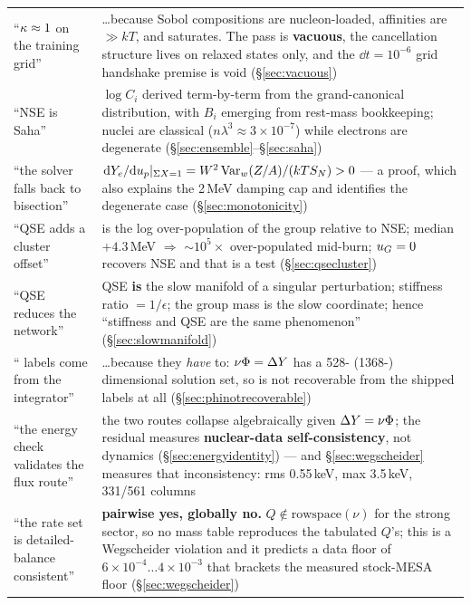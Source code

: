 \begin{longtable}{@{}L{4.4cm} L{10.6cm}@{}}
``$\kappa \approx 1$ on the training grid'' &
\ldots because Sobol compositions are nucleon-loaded, affinities are $\gg kT$,
and \kap{} saturates. The pass is \textbf{vacuous}, the cancellation structure
lives on relaxed states only, and the $\dd t = 10^{-6}$ grid handshake premise
is void (\S\ref{sec:vacuous}) \\

``NSE is Saha'' &
$\log C_i$ derived term-by-term from the grand-canonical distribution, with
$B_i$ emerging from rest-mass bookkeeping; nuclei are classical
($n\lambda^3 \approx 3\times10^{-7}$) while electrons are degenerate
(\S\ref{sec:ensemble}--\S\ref{sec:saha}) \\

``the solver falls back to bisection'' &
$\mathrm{d}Y_{e}/\mathrm{d}u_{p}|_{\Sigma X=1} = W^2 \operatorname*{Var}_w(Z/A)/(kT S_N) > 0$ --- a proof, which
also explains the 2\,MeV damping cap and identifies the degenerate case
(\S\ref{sec:monotonicity}) \\

``QSE adds a cluster offset'' &
\uG{} is the log over-population of the group relative to NSE; median
$+4.3$\,MeV $\Rightarrow$ ${\sim}10^{5}\times$ over-populated mid-burn;
$u_{G} = 0$ recovers NSE and that is a test (\S\ref{sec:qsecluster}) \\

``QSE reduces the network'' &
QSE \textbf{is} the slow manifold of a singular perturbation; stiffness ratio
$= 1/\epsilon$; the group mass is the slow coordinate; hence ``stiffness and QSE
are the same phenomenon'' (\S\ref{sec:slowmanifold}) \\

``\Phifl{} labels come from the integrator'' &
\ldots because they \emph{have} to: $\nu\Phi = \Delta Y$ has a 528- (1368-)
dimensional solution set, so \Phifl{} is not recoverable from the shipped labels
at all (\S\ref{sec:phinotrecoverable}) \\

``the energy check validates the flux route'' &
the two routes collapse algebraically given $\Delta Y = \nu\Phi$; the residual
measures \textbf{nuclear-data self-consistency}, not dynamics
(\S\ref{sec:energyidentity}) --- and \S\ref{sec:wegscheider} measures that
inconsistency: rms 0.55\,keV, max 3.5\,keV, 331/561 columns \\

``the rate set is detailed-balance consistent'' &
\textbf{pairwise yes, globally no.} $Q \notin \mathrm{rowspace}(\nu)$ for the
strong sector, so no mass table reproduces the tabulated $Q$'s; this is a
Wegscheider violation and it predicts a \kap{} data floor of
$6\times10^{-4}\ldots4\times10^{-3}$ that brackets the measured stock-MESA
\kap{} floor (\S\ref{sec:wegscheider}) \\


\end{longtable}
